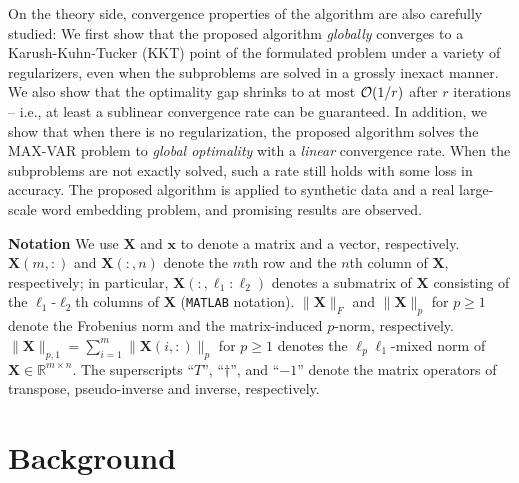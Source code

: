\documentclass[10pt,journal]{IEEEtran}
\newcommand{\X}{\boldsymbol{X}}
\begin{document}
On the theory side, convergence properties of the algorithm are also carefully studied:
We first show that the proposed algorithm \emph{globally} converges to a Karush-Kuhn-Tucker (KKT) point of the formulated problem under a variety of regularizers, even when the subproblems are solved in a grossly inexact manner.
We also show that the optimality gap shrinks to at most ${\cal O}(1/r)$ after $r$ iterations -- i.e.,
at least a sublinear convergence rate can be guaranteed.
In addition, we show that when there is no regularization, the proposed algorithm solves the MAX-VAR problem to \textit{global optimality} with a \textit{linear} convergence rate.
When the subproblems are not exactly solved, such a rate still holds with some loss in accuracy.
The proposed algorithm is applied to synthetic data and a real large-scale word embedding problem, and promising results are observed.

\bigskip

\noindent
{\bf Notation} We use $\X$ and ${\bm x}$ to denote a matrix and a vector, respectively.
$\X(m,:)$ and $\X(:,n)$ denote the $m$th row and the $n$th column of $\X$, respectively;
in particular, $\X(:,\ell_1:\ell_2)$ denotes a submatrix of $\X$ consisting of the $\ell_1$-$\ell_2$th columns of $\X$ (\texttt{MATLAB} notation).
$\|\X\|_F$ and $\|\X\|_p$ for $p\geq 1$ denote the Frobenius norm and the matrix-induced $p$-norm, respectively. $\|\X\|_{p,1} = \sum_{i=1}^m \|\X(i,:)\|_p$ for $p\geq 1$ denotes the $\ell_p\ell_1$-mixed norm of $\X\in\mathbb{R}^{m\times n}$.
The superscripts ``$T$'', ``$\dag$'', and ``${-1}$'' denote the matrix operators of transpose, pseudo-inverse and inverse, respectively. 

\section{Background}
\end{document}
